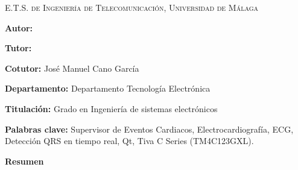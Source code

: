 
\pagestyle{fancy}
\renewcommand{\headrulewidth}{0pt}

\begin{center}
	\scshape
	E.T.S. de Ingeniería de Telecomunicación, Universidad de Málaga 
\end{center}

\bigskip

\begin{center}
	\Large \scshape
	\textbf{\tfgtitlename}
\end{center}

\bigskip \bigskip \bigskip

\begin{minipage}{\textwidth}

\textbf{Autor:} \tfgauthorname

\medskip

\textbf{Tutor:} \tfgtutorname

\medskip

\textbf{Cotutor:} José Manuel Cano García

\medskip

\textbf{Departamento:} Departamento Tecnología Electrónica

\medskip

\textbf{Titulación:} Grado en Ingeniería de sistemas electrónicos

\medskip

\textbf{Palabras clave:} Supervisor de Eventos Cardiacos, Electrocardiografía, ECG, Detección QRS en tiempo real, Qt, Tiva C Series (TM4C123GXL).

\bigskip \bigskip


\end{minipage}

\begin{center}
	\textbf{Resumen}
\end{center}

